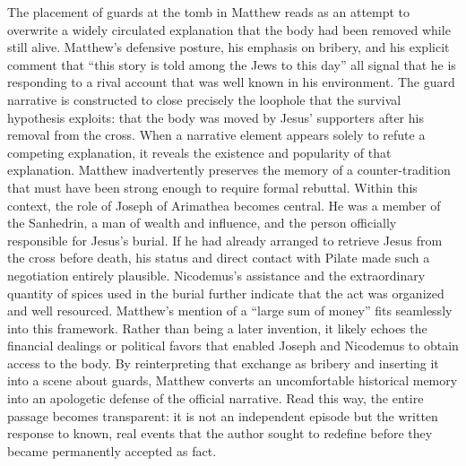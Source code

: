The placement of guards at the tomb in Matthew reads as an attempt to overwrite a widely circulated explanation that the body had been removed while still alive.
Matthew's defensive posture, his emphasis on bribery, and his explicit comment that ``this story is told among the Jews to this day'' all signal that he is responding to a rival account that was well known in his environment.
The guard narrative is constructed to close precisely the loophole that the survival hypothesis exploits: that the body was moved by Jesus' supporters after his removal from the cross.
When a narrative element appears solely to refute a competing explanation, it reveals the existence and popularity of that explanation.
Matthew inadvertently preserves the memory of a counter-tradition that must have been strong enough to require formal rebuttal.
Within this context, the role of Joseph of Arimathea becomes central.
He was a member of the Sanhedrin, a man of wealth and influence, and the person officially responsible for Jesus’s burial.
If he had already arranged to retrieve Jesus from the cross before death, his status and direct contact with Pilate made such a negotiation entirely plausible.
Nicodemus’s assistance and the extraordinary quantity of spices used in the burial further indicate that the act was organized and well resourced.
Matthew’s mention of a “large sum of money” fits seamlessly into this framework.
Rather than being a later invention, it likely echoes the financial dealings or political favors that enabled Joseph and Nicodemus to obtain access to the body.
By reinterpreting that exchange as bribery and inserting it into a scene about guards, Matthew converts an uncomfortable historical memory into an apologetic defense of the official narrative.
Read this way, the entire passage becomes transparent: it is not an independent episode but the written response to known, real events that the author sought to redefine before they became permanently accepted as fact.

